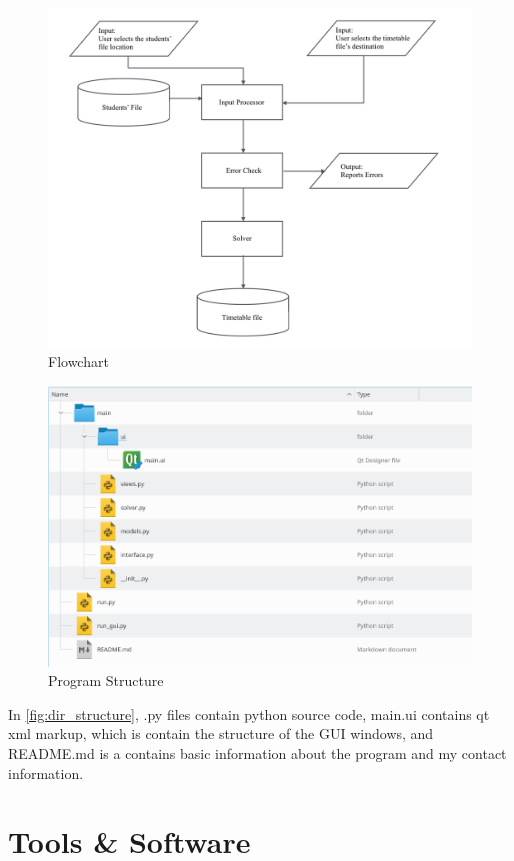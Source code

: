 \documentclass[12pt]{article}
\begin{document}
\begin{figure}[H]
    \caption{Flowchart}
    \centering
    \includegraphics[height=0.4\textheight]{system_flowchart}
\end{figure}
%
\begin{figure}[H]
    \caption{Program Structure}
    \label{fig:dir_structure}
    \includegraphics[height=0.4\textheight]{directory_structure}
\end{figure}

In \autoref{fig:dir_structure}, .py files contain python source code, main.ui contains qt
xml markup, which is contain the structure of the GUI windows, and README.md is a contains
basic information about the program and my contact information.

\section{Tools \& Software}
\end{document}
